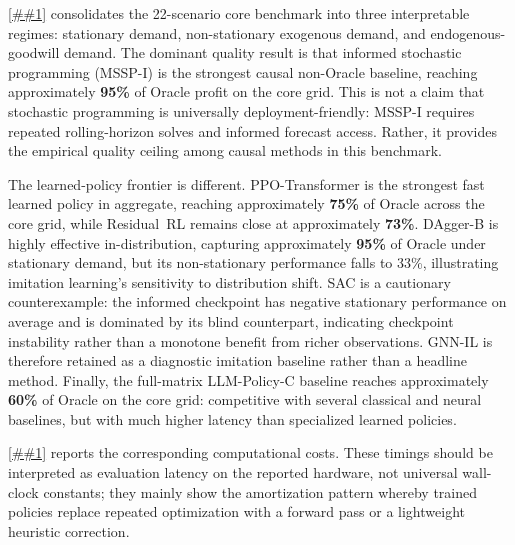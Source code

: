 \documentclass[10pt,a4paper]{article}
\providecommand{\Cref}[1]{\ref{##1}}
\begin{document}
\Cref{tab:summary_performance} consolidates the 22-scenario core
benchmark into three interpretable regimes: stationary demand,
non-stationary exogenous demand, and endogenous-goodwill demand. The
dominant quality result is that informed stochastic programming
(MSSP-I) is the strongest causal non-Oracle baseline, reaching
approximately \textbf{95\%} of Oracle profit on the core grid. This is not a claim
that stochastic programming is universally deployment-friendly: MSSP-I
requires repeated rolling-horizon solves and informed forecast access.
Rather, it provides the empirical quality ceiling among causal methods
in this benchmark.

The learned-policy frontier is different. PPO-Transformer is the
strongest fast learned policy in aggregate, reaching approximately
\textbf{75\%} of Oracle across the core grid, while Residual~RL remains
close at approximately \textbf{73\%}. DAgger-B is highly effective
in-distribution, capturing approximately \textbf{95\%} of Oracle
under stationary demand, but its non-stationary performance falls to
33\%, illustrating imitation learning's sensitivity to distribution
shift. SAC is a cautionary counterexample: the informed checkpoint has
negative stationary performance on average and is dominated by its blind
counterpart, indicating checkpoint instability rather than a monotone
benefit from richer observations. GNN-IL is therefore retained as a
diagnostic imitation baseline rather than a headline method. Finally, the full-matrix LLM-Policy-C
baseline reaches approximately \textbf{60\%} of Oracle on the core grid:
competitive
with several classical and neural baselines, but with much higher
latency than specialized learned policies.

\Cref{tab:compute_quality} reports the corresponding computational
costs. These timings should be interpreted as evaluation latency on the
reported hardware, not universal wall-clock constants; they mainly show
the amortization pattern whereby trained policies replace repeated
optimization with a forward pass or a lightweight heuristic correction.
\end{document}
